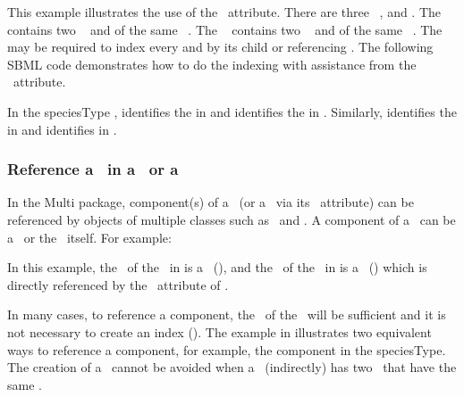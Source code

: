 This example illustrates the use of the \identifyingParentAtt\ attribute. There are three \speciesTypes\ ,  and . The \speciesType\  contains two \speciesTypeInstances\  and  of the same \speciesType\ . The \speciesType\  contains two \speciesTypeInstances\  and  of the same \speciesType\ . The \speciesType\  may be required to index every  and  by its \ListOfInSpeciesTypeBonds child or referencing \species. The following SBML code demonstrates how to do the indexing with assistance from the \identifyingParentAtt\ attribute.  


In the speciesType ,  identifies the  in  and  identifies the  in . Similarly,  identifies the  in  and  identifies  in .

\subsubsection{Reference a \component\ in a \speciesType\ or a \species}
\label{def:SpeciesType:component}

In the Multi package, component(s) of a \speciesType\ (or a \species\ via its \speciesType\ attribute) can be referenced by objects of multiple classes such as \OutwardBindingSite\ and \SpeciesFeature. A component of a \speciesType\ can be a \speciesTypeInstance\ or the \speciesType\ itself. For example:


In this example, the \componentAtt\ of the \outwardBindingSite\ in \species {} is a \speciesTypeInstance\ (), and the \componentAtt\ of the \outwardBindingSite\ in \species {} is a \speciesType\ () which is directly referenced by the \speciesType\ attribute of .  

In many cases, to reference a component,  the \idAtt\ of the \component\ will be sufficient and it is not necessary to create an index (\speciesTypeComponentIndex). The example in  illustrates two equivalent ways to reference a component, for example, the  component in the  speciesType. The creation of a \speciesTypeComponentIndex\ cannot be avoided when a \speciesType\ (indirectly) has two \speciesTypeInstances\ that have the same \idAtt.


